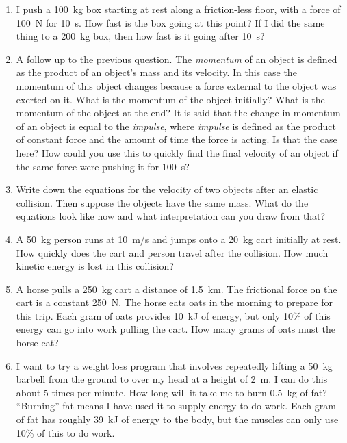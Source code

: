 \begin{enumerate}
\setlength\itemsep{1 in}

\item
I push a \SI{100}{kg} box starting at rest along a friction-less floor, with a force of \SI{100}{\newton} for \SI{10}{\second}. How fast is the box going at this point? If I did the same thing to a \SI{200}{kg} box, then how fast is it going after \SI{10}{s}?
\hugeskip

\item 
A follow up to the previous question. The \emph{momentum} of an object is defined as the product of an object's mass and its velocity. In this case the momentum of this object changes because a force external to the object was exerted on it. What is the momentum of the object initially? What is the momentum of the object at the end? It is said that the change in momentum of an object is equal to the \emph{impulse}, where \emph{impulse} is defined as the product of constant force and the amount of time the force is acting. Is that the case here? How could you use this to quickly find the final velocity of an object if the same force were pushing it for \SI{100}{\second}?
\hugeskip

\item
Write down the equations for the velocity of two objects after an elastic collision. Then suppose the objects have the same mass. What do the equations look like now and what interpretation can you draw from that?

\item 
A \SI{50}{kg} person runs at \SI{10}{m/s} and jumps onto a \SI{20}{kg} cart initially at rest. How quickly does the cart and person travel after the collision. How much kinetic energy is lost in this collision? 

\item 
A horse pulls a \SI{250}{kg} cart a distance of \SI{1.5}{km}. The frictional force on the cart is a constant \SI{250}{\newton}. The horse eats oats in the morning to prepare for this trip. Each gram of oats provides \SI{10}{\kilo\joule} of energy, but only 10\% of this energy can go into work pulling the cart. How many grams of oats must the horse eat? 
\bigskip

\item
I want to try a weight loss program that involves repeatedly lifting a \SI{50}{kg} barbell from the ground to over my head at a height of \SI{2}{\meter}. I can do this about 5 times per minute. How long will it take me to burn \SI{0.5}{kg} of fat? ``Burning'' fat means I have used it to supply energy to do work. Each gram of fat has roughly \SI{39}{\kilo\joule} of energy to the body, but the muscles can only use 10\% of this to do work. 
\bigskip


\end{enumerate}
